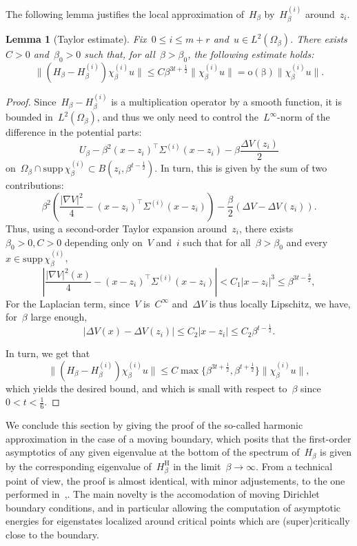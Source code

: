 \documentclass[10pt]{article}
\newcommand{\1}{\mathbbm 1}
\newcommand{\scalingExp}{t}
\newtheorem{lemma}{Lemma}
\begin{document}
    The following lemma justifies the local approximation of~$H_\beta$ by~$H_\beta^{(i)}$ around~$z_i$.
    \begin{lemma}[Taylor estimate]
        \label{lemma:taylor_bound}
        Fix~$0\leq i \leq m+r$ and~$u\in L^2(\Omega_\beta)$.
        There exists~$C>0$ and~$\beta_0>0$ such that, for all~$\beta>\beta_0$, the following estimate holds:
        \begin{equation}
            \label{eq:taylor_bound_witten}
            \|(H_\beta-H_\beta^{(i)})\chi_\beta^{(i)} u\| \leq C\beta^{3\scalingExp+\frac12}\|\chi_\beta^{(i)}u\| = \mathrm{o(\beta)}\|\chi_\beta^{(i)}u\|.
        \end{equation}
    \end{lemma}
    \begin{proof}
        Since~$H_\beta-H_\beta^{(i)}$ is a multiplication operator by a smooth function, it is bounded in~$L^2(\Omega_\beta)$, and thus we only need to control the~$L^\infty$-norm of the difference in the potential parts:
       ~$$U_\beta - \beta^2(x-z_i)^\intercal \Sigma^{(i)}(x-z_i) - \beta \frac{\Delta V(z_i)}2$$ on~$\Omega_\beta \cap\mathrm{supp}\,\chi_\beta^{(i)} \subset B(z_i,\beta^{\scalingExp-\frac12})$.
        In turn, this is given by the sum of two contributions:
       ~$$ \beta^2\left(\frac{|\nabla V|^2}4 - (x-z_i)^\intercal \Sigma^{(i)}(x-z_i) \right) - \frac\beta2(\Delta V - \Delta V(z_i)).$$
        Thus, using a second-order Taylor expansion around~$z_i$, there exists~$\beta_0>0, C>0$ depending only on~$V$ and~$i$ such that for all~$\beta>\beta_0$ and every~$x\in \mathrm{supp}\,\chi_\beta^{(i)}$, 
       ~$$\left|\frac{|\nabla V|^2(x)}4 - (x-z_i)^\intercal \Sigma^{(i)}(x-z_i)\right| < C_1 |x-z_i|^3 \leq \beta^{3\scalingExp-\frac32},$$
        For the Laplacian term, since~$V$ is~$C^\infty$ and~$\Delta V$ is thus locally Lipschitz, we have, for~$\beta$ large enough,
       ~$$ \left| \Delta V(x) - \Delta V(z_i)\right| \leq C_2|x-z_i|\leq C_2 \beta^{\scalingExp-\frac12}.$$

        In turn, we get that 
       ~$$\|(H_\beta-H_\beta^{(i)})\chi_\beta^{(i)} u\| \leq C\max\{\beta^{3\scalingExp+\frac12},\beta^{\scalingExp+\frac12}\}\|\chi_\beta^{(i)}u\|,$$
        which yields the desired bound, and which is small with respect to~$\beta$ since~$0<\scalingExp<\frac16$.

    \end{proof}

    We conclude this section by giving the proof of the so-called harmonic approximation in the case of a moving boundary, which posits that the first-order asymptotics of any given eigenvalue at the bottom of the spectrum of~$H_\beta$ is given by the corresponding eigenvalue of~$H_\beta^{\mathrm H}$ in the limit~$\beta\to\infty$.
    From a technical point of view, the proof is almost identical, with minor adjustements, to the one performed in~\cite[Theorem 11.1]{CFKS87},\cite[]{S83}. The main novelty is the accomodation of moving Dirichlet boundary conditions, and in particular allowing the computation of asymptotic energies for eigenstates localized around critical points which are (super)critically close to the boundary.
\end{document}
